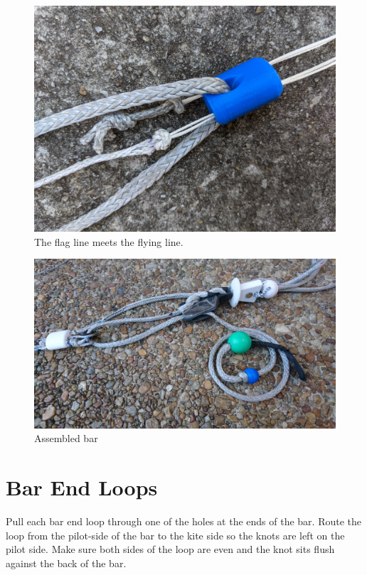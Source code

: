 \documentclass[
]{book}
\begin{document}
\begin{figure}

{\centering \includegraphics[width=0.7\linewidth]{images/flag-line-at-separation-block} 

}

\caption{The flag line meets the flying line.}\label{fig:flag-line-at-separation-block}
\end{figure}

\begin{figure}

{\centering \includegraphics[width=0.7\linewidth]{images/upper_section_of_assembled_bar} 

}

\caption{Assembled bar}\label{fig:upper-section-of-assembled-bar}
\end{figure}

\hypertarget{bar-end-loops-1}{%
\section{Bar End Loops}\label{bar-end-loops-1}}

Pull each bar end loop through one of the holes at the ends of the bar. Route the loop from the pilot-side of the bar to the kite side so the knots are left on the pilot side. Make sure both sides of the loop are even and the knot sits flush against the back of the bar.
\end{document}
